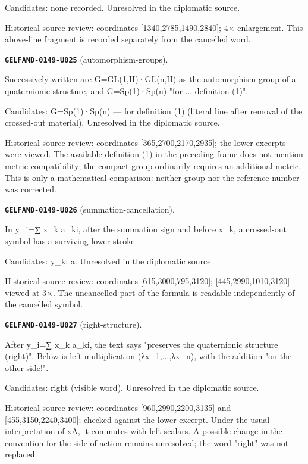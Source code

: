 \documentclass[11pt]{article}
\theoremstyle{definition}
\theoremstyle{remark}
\begin{document}
Candidates: none recorded. Unresolved in the diplomatic source.\par
Historical source review: coordinates [1340,2785,1490,2840]; 4× enlargement. This above-line fragment is recorded separately from the cancelled word.\par\medskip
\noindent\leavevmode{}\label{GELFAND-P001372:automorphism-groups:note}\textbf{\texttt{GELFAND-0149-U025}} (automorphism-groups).\par\nopagebreak[4]
Successively written are G=GL(1,H)·GL(n,H) as the automorphism group of a quaternionic structure, and G=Sp(1)·Sp(n) "for ... definition (1)".\par
Candidates: G=Sp(1)·Sp(n) --- for definition (1) (literal line after removal of the crossed-out material). Unresolved in the diplomatic source.\par
Historical source review: coordinates [365,2700,2170,2935]; the lower excerpts were viewed. The available definition (1) in the preceding frame does not mention metric compatibility; the compact group ordinarily requires an additional metric. This is only a mathematical comparison: neither group nor the reference number was corrected.\par\medskip
\noindent\leavevmode{}\label{GELFAND-P001372:summation-cancellation:note}\textbf{\texttt{GELFAND-0149-U026}} (summation-cancellation).\par\nopagebreak[4]
In y\_i=∑ x\_k a\_ki, after the summation sign and before x\_k, a crossed-out symbol has a surviving lower stroke.\par
Candidates: y\_k; a. Unresolved in the diplomatic source.\par
Historical source review: coordinates [615,3000,795,3120]; [445,2990,1010,3120] viewed at 3×. The uncancelled part of the formula is readable independently of the cancelled symbol.\par\medskip
\noindent\leavevmode{}\label{GELFAND-P001372:right-structure:note}\textbf{\texttt{GELFAND-0149-U027}} (right-structure).\par\nopagebreak[4]
After y\_i=∑ x\_k a\_ki, the text says "preserves the quaternionic structure (right)". Below is left multiplication (λx\_1,...,λx\_n), with the addition "on the other side!".\par
Candidates: right (visible word). Unresolved in the diplomatic source.\par
Historical source review: coordinates [960,2990,2200,3135] and [455,3150,2240,3400]; checked against the lower excerpt. Under the usual interpretation of xA, it commutes with left scalars. A possible change in the convention for the side of action remains unresolved; the word "right" was not replaced.\par\medskip
\end{document}
